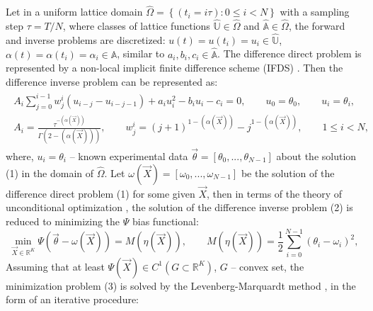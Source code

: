 \documentclass[12pt]{llncs}
\begin{document}
Let in a uniform lattice domain $\widehat{\Omega} =\left\lbrace (t_{i}=i\tau) : 0\leq i <N\right\rbrace$ with a sampling step $\tau=T/N$, where classes of lattice functions $\widehat{ \mathbb{U} } \in \widehat{\Omega}$ and $\widehat{\mathbb{A} } \in \widehat{\Omega}$, the forward and inverse problems are discretized: $u(t) =u(t_{i}) = u_{i} \in \widehat{ \mathbb{U} } $, $ \alpha(t) = \alpha(t_{i}) = \alpha_{i} \in \widehat{ \mathbb{A} }$, similar to $a_{i}, b_{i}, c_{i} \in \widehat{ \mathbb{A} } $. The difference direct problem is represented by a non-local implicit finite difference scheme (IFDS) \cite{DA_Solid_2022_Investigation_of_Finite_42}. Then the difference inverse problem can be represented as:
\begin{eqnarray} \label{implicit_sheme_FEQ__inverse_DIFF}
	\begin{gathered}
		A_i \sum_{j=0}^{i-1} w^{i}_{j} \left( u_{i-j} - u_{i-j-1} \right) + a_i u_{i}^{2}  - b_i u_i - c_i = 0, \qquad u_0 = \theta_{0}, \qquad u_{i} = \theta_{i}, \\
		A_i = \frac{\tau^{-( \alpha( \overrightarrow{X} ) )}}{\Gamma ( 2 - ( \alpha( \overrightarrow{X} ) ) ) }, \qquad w^{i}_{j} = (j+1)^{1-( \alpha( \overrightarrow{X} ) )} - j^{1-( \alpha( \overrightarrow{X} ) )}, \qquad 1 \leq i < N,
	\end{gathered}
\end{eqnarray}
where, $u_{i} = \theta_{i}$ -- known experimental data $\overrightarrow{\theta} = \left[ \theta_{0}, ..., \theta_{N-1}\right] $ about the solution (1) in the domain of $\widehat{\Omega}$. Let $ \omega (\overrightarrow{X}) = \left[ \omega_{0}, ..., \omega_{N-1}\right] $ be the solution of the difference direct problem (1) for some given $\overrightarrow{X}$, then in terms of the theory of unconditional optimization \cite{Dennis_1983_unconstr_optim}, the solution of the difference inverse problem (2) is reduced to minimizing the $\Psi$ bias functional:
\begin{equation}\label{diff_non-gomogen_FEQ_reverse_MIN__2}
	\min\limits_{ \overrightarrow{X} \in \mathbb{ R }^{K} } \Psi \left( \overrightarrow{\theta} - \omega ( \overrightarrow{X} ) \right) = M \left( \eta (\overrightarrow{X}) \right), \qquad M \left( \eta (\overrightarrow{X}) \right) = \frac{1}{2} \sum_{i=0}^{N-1} \left( \theta_{i} - \omega_{i} \right)^{2},
\end{equation}
Assuming that at least $\Psi (\overrightarrow{X} ) \in C^1 (G\subset\mathbb{ R }^{K}) $, $G$ -- convex set, the minimization problem (3) is solved by the Levenberg-Marquardt method \cite{More_1978_the_Lev_Mar_alg}, in the form of an iterative procedure:
\end{document}
